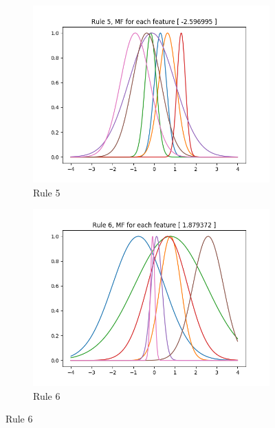 \documentclass[11pt,a4paper]{article}
\begin{document}
\begin{figure}[htbp]
\begin{subfigure}{\columnwidth}
  \includegraphics[width=\columnwidth,keepaspectratio]{rule-5.png}  
  \caption{Rule 5}
  \label{fig:rules:rule-5}
\end{subfigure}
\begin{subfigure}{\columnwidth}
  \centering
  \includegraphics[width=\columnwidth,keepaspectratio]{rule-6.png}
  \caption{Rule 6}
  \label{fig:rules:rule-6}
\end{subfigure}
\end{figure}
\end{document}
